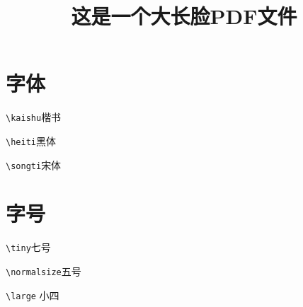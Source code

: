 \documentclass[UTF8]{article}
\title{这是一个大长脸PDF文件}
\date{}
\begin{document}
\maketitle

\section{字体}
\kaishu \verb!\kaishu!楷书

\heiti \verb!\heiti!黑体

\songti \verb!\songti!宋体

\section{字号}
\tiny \verb!\tiny!七号

\normalsize \verb!\normalsize!五号

\large \verb!\large! 小四
\end{document}
